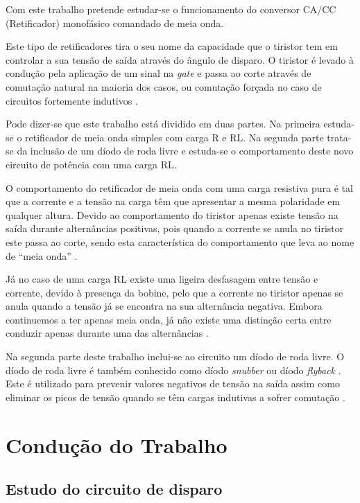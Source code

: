 \documentclass[a4paper,11pt]{article}
\numberwithin{equation}{section}
\begin{document}
Com este trabalho pretende estudar-se o funcionamento do conversor CA/CC (Retificador) monofásico comandado de meia onda.

Este tipo de retificadores tira o seu nome da capacidade que o tiristor tem em controlar a sua tensão de saída através do ângulo de disparo. O tiristor é levado à condução pela aplicação de um sinal na \textit{gate} e passa ao corte através de comutação natural na maioria dos casos, ou comutação forçada no caso de circuitos fortemente indutivos \cite{Rashid}. 

Pode dizer-se que este trabalho está dividido em duas partes. Na primeira estuda-se o retificador de meia onda simples com carga R e RL. Na segunda parte trata-se da inclusão de um díodo de roda livre e estuda-se o comportamento deste novo circuito de potência com uma carga RL.

O comportamento do retificador de meia onda com uma carga resistiva pura é tal que a corrente e a tensão na carga têm que apresentar a mesma polaridade em qualquer altura. Devido ao comportamento do tiristor apenas existe tensão na saída durante alternâncias positivas, pois quando a corrente se anula no tiristor este passa ao corte, sendo esta característica do comportamento que leva ao nome de ``meia onda''  \cite{Kassakian}.

Já no caso de uma carga RL existe uma ligeira desfasagem entre tensão e corrente, devido à presença da bobine, pelo que a corrente no tiristor apenas se anula quando a tensão já se encontra na sua alternância negativa. Embora continuemos a ter apenas meia onda, já não existe uma distinção certa entre conduzir apenas durante uma das alternâncias \cite{Kassakian}. 

Na segunda parte deste trabalho inclui-se ao circuito um díodo de roda livre. O díodo de roda livre é também conhecido como díodo \textit{snubber} ou díodo \textit{flyback} \cite{Silva}. Este é utilizado para prevenir valores negativos de tensão na saída assim como eliminar os picos de tensão quando se têm cargas indutivas a sofrer comutação \cite{Kassakian}. 



\section{Condução do Trabalho}

\subsection{Estudo do circuito de disparo}
\end{document}

